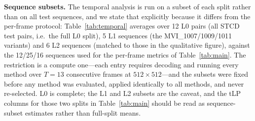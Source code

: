 \noindent\textbf{Sequence subsets.} The temporal analysis is run on a subset of each split rather than on all test sequences, and we state that explicitly because it differs from the per-frame protocol: Table~\ref{tab:temporal} averages over 12 L0 pairs (all STCD test pairs, i.e.\ the full L0 split), 5 L1 sequences (the MVI\_1007/1009/1011 variants) and 6 L2 sequences (matched to those in the qualitative figure), against the 12/25/16 sequences used for the per-frame metrics of Table~\ref{tab:main}. The restriction is a compute one---each entry requires decoding and running every method over $T{=}13$ consecutive frames at $512{\times}512$---and the subsets were fixed before any method was evaluated, applied identically to all methods, and never re-selected. L0 is complete; the L1 and L2 subsets are the caveat, and the tLP columns for those two splits in Table~\ref{tab:main} should be read as sequence-subset estimates rather than full-split means.

